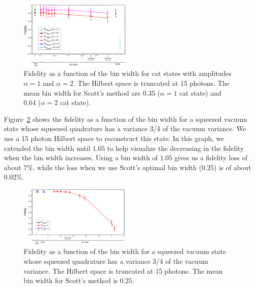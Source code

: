 \documentclass[
reprint,
superscriptaddress,
showpacs,
amsmath,
amssymb,
aps,
pra,
longbibliography
]{revtex4-1}
\begin{document}
\begin{figure}
\includegraphics[width=0.49\textwidth]{fidelity_vs_binwidth_15_photons_catstate.eps}
\caption{Fidelity as a function of the bin width for cat states with amplitudes $\alpha=1$ and $\alpha=2$. The Hilbert space is truncated at 15 photons. The mean bin width for Scott's method are $0.35$ ($\alpha=1$ cat state) and $0.64$ ($\alpha=2$ cat state).}
\label{fig-fidelity_vs_binwidth_15_photons_catstate}
\end{figure}

Figure~\ref{fig-squeezedvacuum_15_photons_Var=075} shows the fidelity as a function
of the bin width for a squeezed vacuum state whose squeezed quadrature has a variance 3/4 of the vacuum variance.  We use a 15 photon Hilbert space to reconstruct this state. In this graph, we extended the bin width until $1.05$ to help visualize the decreasing in the fidelity when the bin width increases. Using a bin width of $1.05$ gives us a fidelity loss of about $7\%$, while the loss when we use Scott's optimal bin width (0.25) is of about $0.02\%$.


\begin{figure}[h]
\includegraphics[width=0.49\textwidth]{squeezedvacuum_15_photons_Var=075.eps}
\caption{Fidelity as a function of the bin width for a squeezed vacuum state whose squeezed quadrature has a variance 3/4 of the vacuum variance. The Hilbert space is truncated at 15 photons. The mean bin width for Scott's method is $0.25$.}
\label{fig-squeezedvacuum_15_photons_Var=075}
\end{figure}
\end{document}
